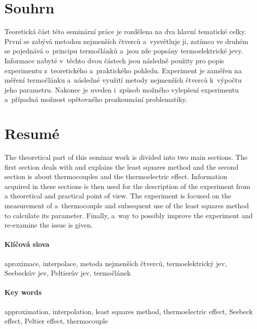 \section[Souhrn (Resumé)]{Souhrn}
Teoretická část této seminární práce je rozdělena na dva hlavní tematické
celky. První se zabývá metodou nejmenších čtverců a~vysvětluje ji, zatímco ve
druhém se pojednává o~principu termočlánků a~jsou zde popsány termoelektrické
jevy. Informace nabyté v~těchto dvou částech jsou následně použity pro popis
experimentu z~teoretického a~praktického pohledu. Experiment je zaměřen na
měření termočlánku a~následné využití metody nejmenších čtverců k~výpočtu jeho
parametru. Nakonec je uveden i~způsob možného vylepšení experimentu a~případná
možnost opětovného prozkoumání problematiky.

\section*{Resumé}
The theoretical part of this seminar work is divided into two main sections. The first
section deals with and explains the least squares method and the second section is
about thermocouples and the thermoelectric effect. Information acquired in these
sections is then used for the description of the experiment from a theoretical and
practical point of view. The experiment is focused on the measurement of
a~thermocouple and subsequent use of the least squares method to calculate its
parameter. Finally, a~way to possibly improve the experiment and re-examine the
issue is given.



\paragraph{Klíčová slova}
aproximace, interpolace, metoda nejmenších čtverců, termoelektrický jev, 
Seebeckův jev, Peltierův jev, termočlánek

\paragraph{Key words}
approximation, interpolation, least squares method, thermoelectric effect, 
Seebeck effect, Peltier effect, thermocouple

